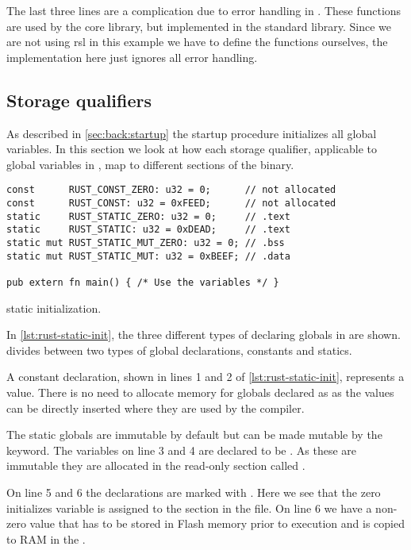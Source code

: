 The last three lines are a complication due to error handling in {\rust}.
These functions are used by the core library, but implemented in the standard library.
Since we are not using \gls{rsl} in this example we have to define the functions ourselves, the implementation here just ignores all error handling.

\subsection{Storage qualifiers}

As described in \autoref{sec:back:startup} the startup procedure initializes all global variables.
In this section we look at how each storage qualifier,  applicable to global variables in {\rust}, map to different sections of the {\elf} binary.

\begin{listing}[H]
\begin{verbatim}
const      RUST_CONST_ZERO: u32 = 0;      // not allocated
const      RUST_CONST: u32 = 0xFEED;      // not allocated
static     RUST_STATIC_ZERO: u32 = 0;     // .text
static     RUST_STATIC: u32 = 0xDEAD;     // .text
static mut RUST_STATIC_MUT_ZERO: u32 = 0; // .bss
static mut RUST_STATIC_MUT: u32 = 0xBEEF; // .data

pub extern fn main() { /* Use the variables */ }
\end{verbatim}
\caption{{\rust} static initialization.}
\label{lst:rust-static-init}
\end{listing}

In \autoref{lst:rust-static-init}, the three different types of declaring globals in {\rust} are shown.
{\rust} divides between two types of global declarations, constants and statics.

A constant declaration, shown in lines 1 and 2 of \autoref{lst:rust-static-init}, represents a value.
There is no need to allocate memory for globals declared as  as the values can be directly inserted where they are used by the compiler.

The static globals are immutable by default but can be made mutable by the  keyword.
The variables on line 3 and 4 are declared to be .
As these are immutable they are allocated in the read-only section called .

On line 5 and 6 the declarations are marked with .
Here we see that the zero initializes variable is assigned to the  section in the {\elf} file.
On line 6 we have a non-zero value that has to be stored in Flash memory prior to execution and is copied to RAM in the .

